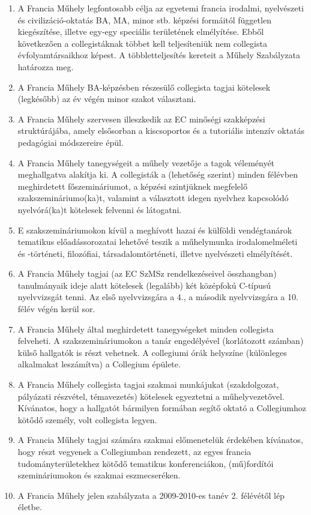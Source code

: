 \documentclass{rulebook}
\begin{document}
\begin{enumerate}
	\item A Francia Műhely legfontosabb célja az egyetemi francia irodalmi, nyelvészeti és civilizáció-oktatás BA, MA, minor stb. képzési formáitól független kiegészítése, illetve egy-egy speciális területének elmélyítése. Ebből következően a collegistáknak többet kell teljesíteniük nem collegista évfolyamtársaikhoz képest. A többletteljesítés kereteit a Műhely Szabályzata határozza meg.
	\item A Francia Műhely BA-képzésben részesülő collegista tagjai kötelesek (legkésőbb) az év végén minor szakot választani.
	\item A Francia Műhely szervesen illeszkedik az EC minőségi szakképzési struktúrájába, amely elsősorban a kiscsoportos és a tutoriális intenzív oktatás pedagógiai módszereire épül.
	\item A Francia Műhely tanegységeit a műhely vezetője a tagok véleményét meghallgatva alakítja ki. A collegisták a (lehetőség szerint) minden félévben meghirdetett főszemináriumot, a képzési szintjüknek megfelelő szakszemináriumo(ka)t, valamint a választott idegen nyelvhez kapcsolódó nyelvórá(ka)t kötelesek felvenni és látogatni.
	\item E szakszemináriumokon kívül a meghívott hazai és külföldi vendégtanárok tematikus előadássorozatai lehetővé teszik a műhelymunka irodalomelméleti és -történeti, filozófiai, társadalomtörténeti, illetve nyelvészeti elmélyítését.
	\item A Francia Műhely tagjai (az EC SzMSz rendelkezéseivel összhangban) tanulmányaik ideje alatt kötelesek (legalább) két középfokú C-típusú nyelvvizsgát tenni. Az első nyelvvizsgára a 4., a második nyelvvizsgára a 10. félév végén kerül sor.
	\item A Francia Műhely által meghirdetett tanegységeket minden collegista felveheti. A szakszemináriumokon a tanár engedélyével (korlátozott számban) külső hallgatók is részt vehetnek. A collegiumi órák helyszíne (különleges alkalmakat leszámítva) a Collegium épülete.
	\item A Francia Műhely collegista tagjai szakmai munkájukat (szakdolgozat, pályázati részvétel, témavezetés) kötelesek egyeztetni a műhelyvezetővel. Kívánatos, hogy a hallgatót bármilyen formában segítő oktató a Collegiumhoz kötődő személy, volt collegista legyen.
	\item A Francia Műhely tagjai számára szakmai előmenetelük érdekében kívánatos, hogy részt vegyenek a Collegiumban rendezett, az egyes francia tudományterületekhez kötődő tematikus konferenciákon, (mű)fordítói szemináriumokon és szakmai eszmecseréken.
	\item A Francia Műhely jelen szabályzata a 2009-2010-es tanév 2. félévétől lép életbe.
\end{enumerate}
\end{document}
